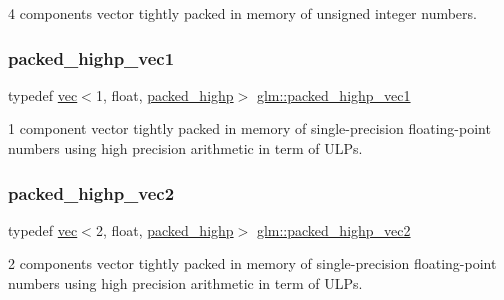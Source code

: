 4 components vector tightly packed in memory of unsigned integer numbers. 

\mbox{\label{group__gtc__type__aligned_ga0356e10a8b10f699cf7cf4308f449c83}} 
\subsubsection{\texorpdfstring{packed\+\_\+highp\+\_\+vec1}{packed\_highp\_vec1}}
{\footnotesize\ttfamily typedef \mbox{\hyperlink{structglm_1_1vec}{vec}}$<$1, float, \mbox{\hyperlink{namespaceglm_a36ed105b07c7746804d7fdc7cc90ff25a8e8791ee77fe079b1291f710d88031bf}{packed\+\_\+highp}}$>$ \mbox{\hyperlink{group__gtc__type__aligned_ga0356e10a8b10f699cf7cf4308f449c83}{glm\+::packed\+\_\+highp\+\_\+vec1}}}



1 component vector tightly packed in memory of single-\/precision floating-\/point numbers using high precision arithmetic in term of U\+L\+Ps. 

\mbox{\label{group__gtc__type__aligned_ga15068ebf3dae2c205d90b1d36780bf9b}} 
\subsubsection{\texorpdfstring{packed\+\_\+highp\+\_\+vec2}{packed\_highp\_vec2}}
{\footnotesize\ttfamily typedef \mbox{\hyperlink{structglm_1_1vec}{vec}}$<$2, float, \mbox{\hyperlink{namespaceglm_a36ed105b07c7746804d7fdc7cc90ff25a8e8791ee77fe079b1291f710d88031bf}{packed\+\_\+highp}}$>$ \mbox{\hyperlink{group__gtc__type__aligned_ga15068ebf3dae2c205d90b1d36780bf9b}{glm\+::packed\+\_\+highp\+\_\+vec2}}}



2 components vector tightly packed in memory of single-\/precision floating-\/point numbers using high precision arithmetic in term of U\+L\+Ps. 

